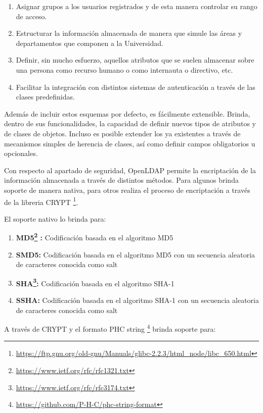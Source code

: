 \begin{enumerate}
	\item Asignar grupos a los usuarios registrados y de esta manera controlar su rango de acceso.
	\item Estructurar la información almacenada de manera que simule las áreas y departamentos
	que componen a la Universidad.
	\item Definir, sin mucho esfuerzo, aquellos atributos que se suelen almacenar sobre una persona
	como recurso humano o como internauta o directivo, etc.
	\item Facilitar la integración con distintos sistemas de autenticación a través de las clases
	predefinidas.
\end{enumerate}

Además de incluir estos esquemas por defecto, es fácilmente extensible. Brinda, dentro de sus
funcionalidades, la capacidad de definir nuevos tipos de atributos y de clases de objetos. Incluso
es posible extender los ya existentes a través de mecanismos simples de herencia de clases, así como
definir campos obligatorios u opcionales.

Con respecto al apartado de seguridad, OpenLDAP permite la encriptación de la información
almacenada a través de distintos métodos. Para algunos brinda soporte de manera nativa, para 
otros realiza el proceso de encriptación a través de la libreria CRYPT \footnote{ 
\url{https://ftp.gnu.org/old-gnu/Manuals/glibc-2.2.3/html_node/libc_650.html}}.

\newpage

El soporte nativo lo brinda para:

\begin{enumerate}
	\item {\bf MD5\footnote{\url{https://www.ietf.org/rfc/rfc1321.txt}} :} Codificación basada 
		en el algoritmo MD5
	\item {\bf SMD5:} Codificación basada en el algoritmo MD5 con un secuencia aleatoria de 
		caracteres conocida como salt
	\item {\bf SHA\footnote{\url{https://www.ietf.org/rfc/rfc3174.txt}}:} Codificación basada 
		en el algoritmo SHA-1
	\item {\bf SSHA:} Codificación basada en el algoritmo SHA-1 con un secuencia aleatoria de 
		caracteres conocida como salt 
\end{enumerate}

A través de CRYPT y el formato PHC string \footnote{ \url{https://github.com/P-H-C/phc-string-format}}
brinda soporte para:

